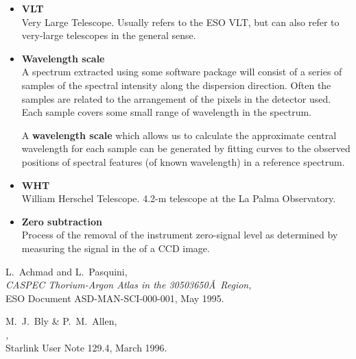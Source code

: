 {{\begin{itemize}
\item {\bf\label{gl_vlt}VLT}\\
      Very Large Telescope.  Usually refers to the ESO VLT, but can
      also refer to very-large telescopes in the general sense.

\item {\bf\label{gl_wavelength}Wavelength scale}\\
      A spectrum extracted using some software package will consist
      of a series of samples of the spectral intensity along the
      dispersion direction.  Often the samples are related to the
      arrangement of the pixels in the detector used.  Each sample
      covers some small range of wavelength in the spectrum.

      A {\bf wavelength scale} which allows us to calculate the
      approximate central wavelength for each sample can be generated
      by fitting curves to the observed positions of spectral features
      (of known wavelength) in a reference spectrum.

\item {\bf\label{gl_wht}WHT}\\
      William Herschel Telescope.  4.2-m telescope
      at the La Palma Observatory.

\item {\bf\label{gl_zero_sub}Zero subtraction}\\
      Process of the removal of the instrument zero-signal level as
      determined by measuring the signal in the
       of a CCD image.


\end{itemize}

\scspec{\normalsize}{ }

\newpage
{}
\begin{thebibliography}{999}

 L.~Achmad and L.~Pasquini,\\
      {\sl CASPEC Thorium-Argon Atlas in the
      3050\scspec{--}{-}3650\AA\ Region,}\\
      ESO Document ASD-MAN-SCI-000-001, May 1995.

 M.~J.~Bly \& P.~M.~Allen,\\
      {\sl {},}\\
      Starlink User Note 129.4, March 1996.


\end{thebibliography}}}
